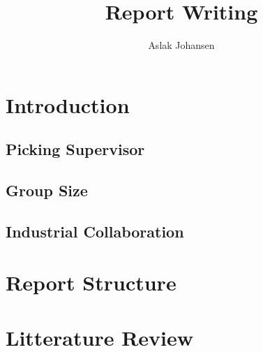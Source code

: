 \documentclass[a4paper]{memoir}
\title{Report Writing \\ \scalebox{0.85}{for Software BSc and MSc Projects}}
\author{Aslak Johansen}
\begin{document}
\maketitle
\tableofcontents

\chapter{Introduction}

\section{Picking Supervisor}

\section{Group Size}

\section{Industrial Collaboration}

\chapter{Report Structure}

\chapter{Litterature Review}
\end{document}
